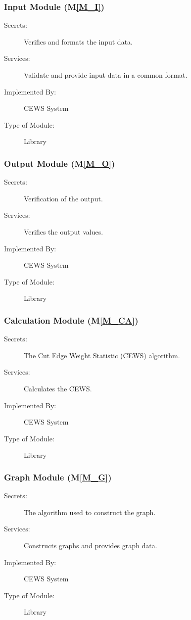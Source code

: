 \documentclass[12pt, titlepage]{article}
\newcommand{\mref}[1]{M\ref{#1}}
\begin{document}
\subsubsection{Input Module (\mref{M_I})}

\begin{description}
\item[Secrets:] Verifies and formats the input data.
\item[Services:] Validate and provide input data in a common format.
\item[Implemented By:] CEWS System
\item[Type of Module:] Library
\end{description}

\subsubsection{Output Module (\mref{M_O})}

\begin{description}
\item[Secrets:] Verification of the output.
\item[Services:] Verifies the output values.
\item[Implemented By:] CEWS System
\item[Type of Module:] Library
\end{description}

\subsubsection{Calculation Module (\mref{M_CA})}

\begin{description}
\item[Secrets:] The Cut Edge Weight Statistic (CEWS) algorithm.
\item[Services:] Calculates the CEWS.
\item[Implemented By:] CEWS System
\item[Type of Module:] Library
\end{description}

\subsubsection{Graph Module (\mref{M_G})}

\begin{description}
\item[Secrets:]The algorithm used to construct the graph.
\item[Services:] Constructs graphs and provides graph data.
\item[Implemented By:] CEWS System
\item[Type of Module:] Library
\end{description}
\end{document}
